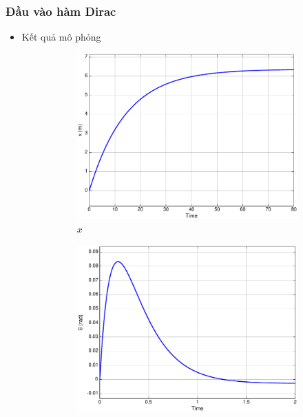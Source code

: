 \documentclass[12pt,a4paper]{article}
\begin{document}
\subsubsection{Đầu vào hàm Dirac}
\begin{itemize}
    \item Kết quả mô phỏng 
    \begin{figure}[ht]
        \centering
        \begin{subfigure}[b]{0.495\linewidth}
            \centering
            \includegraphics[width=\linewidth]{phan_tich_x_dirac.pdf}
            \caption{$x$}
        \end{subfigure}\hfill
        \begin{subfigure}[b]{0.495\linewidth}
            \centering
            \includegraphics[width=\linewidth]{phan_tich_theta_dirac.pdf}

\end{subfigure}
\end{figure}
\end{itemize}
\end{document}
